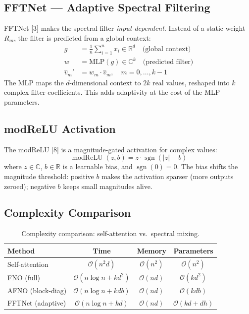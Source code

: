 \documentclass[11pt,a4paper]{article}
\theoremstyle{definition}
\theoremstyle{remark}
\newcommand{\R}{\mathbb{R}}
\newcommand{\C}{\mathbb{C}}
\newcommand{\abs}[1]{\left\lvert#1\right\rvert}
\newcommand{\sign}{\operatorname{sgn}}
\newcommand{\modReLU}{\operatorname{modReLU}}
\newcommand{\bigO}{\mathcal{O}}
\begin{document}
\subsection{FFTNet --- Adaptive Spectral Filtering}

FFTNet [3] makes the spectral filter \emph{input-dependent}.
Instead of a static weight $R_m$, the filter is predicted from a global context:
\begin{align}
  g &= \frac{1}{n} \sum_{i=1}^{n} x_i \in \R^d \quad \text{(global context)} \\
  w &= \text{MLP}(g) \in \C^k \quad \text{(predicted filter)} \\
  \hat{v}_m' &= w_m \cdot \hat{v}_m, \quad m = 0, \ldots, k-1
\end{align}
The MLP maps the $d$-dimensional context to $2k$ real values, reshaped into $k$
complex filter coefficients. This adds adaptivity at the cost of the MLP parameters.

\subsection{modReLU Activation}

The modReLU [8] is a magnitude-gated activation for complex
values:
\begin{equation}
  \modReLU(z, b) = z \cdot \sign(\abs{z} + b)
  \label{eq:modrelu}
\end{equation}
where $z \in \C$, $b \in \R$ is a learnable bias, and $\sign(0) = 0$. The bias
shifts the magnitude threshold: positive $b$ makes the activation sparser (more
outputs zeroed); negative $b$ keeps small magnitudes alive.

\subsection{Complexity Comparison}

\begin{table}[h]
\centering
\caption{Complexity comparison: self-attention vs.\ spectral mixing.}
\label{tab:complexity}
\begin{tabular}{lccc}
\toprule
\textbf{Method} & \textbf{Time} & \textbf{Memory} & \textbf{Parameters} \\
\midrule
Self-attention & $\bigO(n^2 d)$ & $\bigO(n^2)$ & $\bigO(n^2)$ \\
FNO (full) & $\bigO(n \log n + k d^2)$ & $\bigO(n d)$ & $\bigO(k d^2)$ \\
AFNO (block-diag) & $\bigO(n \log n + k d b)$ & $\bigO(n d)$ & $\bigO(k d b)$ \\
FFTNet (adaptive) & $\bigO(n \log n + k d)$ & $\bigO(n d)$ & $\bigO(k d + d h)$ \\
\bottomrule
\end{tabular}
\end{table}
\end{document}
